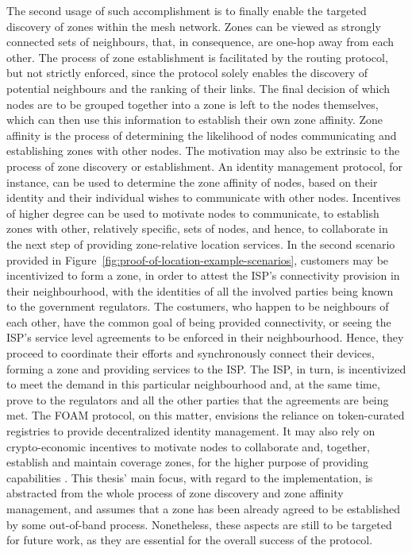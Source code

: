 The second usage of such accomplishment is to finally enable the targeted discovery of zones within the mesh network. Zones can be viewed as strongly connected sets of neighbours, that, in consequence, are one-hop away from each other. The process of zone establishment is facilitated by the routing protocol, but not strictly enforced, since the protocol solely enables the discovery of potential neighbours and the ranking of their links. The final decision of which nodes are to be grouped together into a zone is left to the nodes themselves, which can then use this information to establish their own zone affinity. Zone affinity is the process of determining the likelihood of nodes communicating and establishing zones with other nodes. The motivation may also be extrinsic to the process of zone discovery or establishment. An identity management protocol, for instance, can be used to determine the zone affinity of nodes, based on their identity and their individual wishes to communicate with other nodes. Incentives of higher degree can be used to motivate nodes to communicate, to establish zones with other, relatively specific, sets of nodes, and hence, to collaborate in the next step of providing zone-relative location services. In the second scenario provided in Figure~\ref{fig:proof-of-location-example-scenarios}, customers may be incentivized to form a zone, in order to attest the ISP's connectivity provision in their neighbourhood, with the identities of all the involved parties being known to the government regulators. The costumers, who happen to be neighbours of each other, have the common goal of being provided connectivity, or seeing the ISP's service level agreements to be enforced in their neighbourhood. Hence, they proceed to coordinate their efforts and synchronously connect their devices, forming a zone and providing \pol{} services to the ISP. The ISP, in turn, is incentivized to meet the demand in this particular neighbourhood and, at the same time, prove to the regulators and all the other parties that the agreements are being met. The FOAM protocol, on this matter, envisions the reliance on token-curated registries to provide decentralized identity management. It may also rely on crypto-economic incentives to motivate nodes to collaborate and, together, establish and maintain coverage zones, for the higher purpose of providing \pol{} capabilities \cite{foam-white-paper}. This thesis' main focus, with regard to the \poc{} implementation, is abstracted from the whole process of zone discovery and zone affinity management, and assumes that a zone has been already agreed to be established by some out-of-band process. Nonetheless, these aspects are still to be targeted for future work, as they are essential for the overall success of the protocol.

